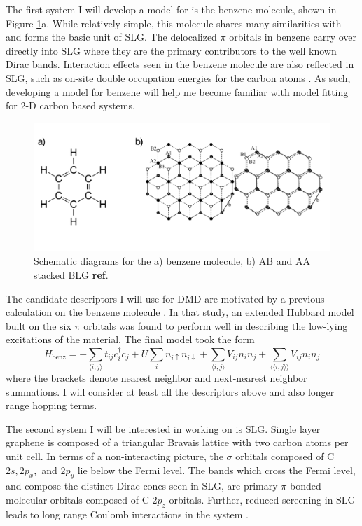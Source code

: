 \documentclass[12pt]{article}
\begin{document}
The first system I will develop a model for is the benzene molecule, shown in Figure \ref{fig:proposed}a.
While relatively simple, this molecule shares many similarities with and forms the basic unit of SLG.
The delocalized $\pi$ orbitals in benzene carry over directly into SLG where they are the primary contributors to the well known Dirac bands.
Interaction effects seen in the benzene molecule are also reflected in SLG, such as on-site double occupation energies for the carbon atoms \cite{Zheng2017, Wagner2015}.
As such, developing a model for benzene will help me become familiar with model fitting for 2-D carbon based systems.

\begin{figure}
\centering
\includegraphics[width=1.0\linewidth]{./figs/proposed.pdf}
\caption{Schematic diagrams for the a) benzene molecule, b) AB and AA stacked BLG \textbf{ref}.}
\label{fig:proposed}
\end{figure}

The candidate descriptors I will use for DMD are motivated by a previous calculation on the benzene molecule \cite{Wagner2015}.
In that study, an extended Hubbard model built on the six $\pi$ orbitals was found to perform well in describing the low-lying excitations of the material.
The final model took the form 
\begin{equation}
H_\text{benz} = -\sum_{\langle i,j \rangle} t_{ij}c_i^\dagger c_j + U \sum_i n_{i\uparrow}n_{i\downarrow}  + \sum_{\langle i,j \rangle}V_{ij} n_i n_j + \sum_{\langle \langle i,j \rangle\rangle}V_{ij} n_i n_j
\label{Hbenz}
\end{equation}
where the brackets denote nearest neighbor and next-nearest neighbor summations.
I will consider at least all the descriptors above and also longer range hopping terms.

The second system I will be interested in working on is SLG.
Single layer graphene is composed of a triangular Bravais lattice with two carbon atoms per unit cell.
In terms of a non-interacting picture, the $\sigma$ orbitals composed of C $2s, 2p_x,$ and $2p_y$ lie below the Fermi level.
The bands which cross the Fermi level, and compose the distinct Dirac cones seen in SLG, are primary $\pi$ bonded molecular orbitals composed of C $2p_z$ orbitals.
Further, reduced screening in SLG leads to long range Coulomb interactions in the system \cite{Elias2012, Yu2013}.
\end{document}
